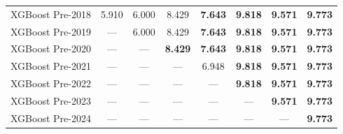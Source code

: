 \begin{table}[htbp]
{\begin{tabular}{lccccccc}
XGBoost Pre-2018 & 5.910 & 6.000 & 8.429 & \textbf{7.643} & \textbf{9.818} & \textbf{9.571} & \textbf{9.773} \\
XGBoost Pre-2019 & --- & 6.000 & 8.429 & \textbf{7.643} & \textbf{9.818} & \textbf{9.571} & \textbf{9.773} \\
XGBoost Pre-2020 & --- & --- & \textbf{8.429} & \textbf{7.643} & \textbf{9.818} & \textbf{9.571} & \textbf{9.773} \\
XGBoost Pre-2021 & --- & --- & --- & 6.948 & \textbf{9.818} & \textbf{9.571} & \textbf{9.773} \\
XGBoost Pre-2022 & --- & --- & --- & --- & \textbf{9.818} & \textbf{9.571} & \textbf{9.773} \\
XGBoost Pre-2023 & --- & --- & --- & --- & --- & \textbf{9.571} & \textbf{9.773} \\
XGBoost Pre-2024 & --- & --- & --- & --- & --- & --- & \textbf{9.773} \\
\bottomrule
\end{tabular}%
}
\end{table}
